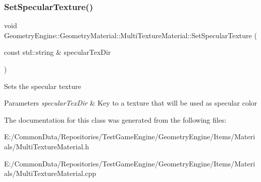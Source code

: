 \subsubsection{\texorpdfstring{SetSpecularTexture()}{SetSpecularTexture()}}
{\footnotesize\ttfamily void Geometry\+Engine\+::\+Geometry\+Material\+::\+Multi\+Texture\+Material\+::\+Set\+Specular\+Texture (\begin{DoxyParamCaption}\item[{const std\+::string \&}]{specular\+Tex\+Dir }\end{DoxyParamCaption})}

Sets the specular texture 
\begin{DoxyParams}{Parameters}
{\em specular\+Tex\+Dir} & Key to a texture that will be used as specular color \\
\hline
\end{DoxyParams}


The documentation for this class was generated from the following files\+:\begin{DoxyCompactItemize}
\item 
E\+:/\+Common\+Data/\+Repositories/\+Test\+Game\+Engine/\+Geometry\+Engine/\+Items/\+Materials/Multi\+Texture\+Material.\+h\item 
E\+:/\+Common\+Data/\+Repositories/\+Test\+Game\+Engine/\+Geometry\+Engine/\+Items/\+Materials/Multi\+Texture\+Material.\+cpp\end{DoxyCompactItemize}
